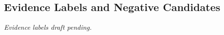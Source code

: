 \subsection{Evidence Labels and Negative Candidates}
\label{sec:evidence-labels}
\textit{Evidence labels draft pending.}
